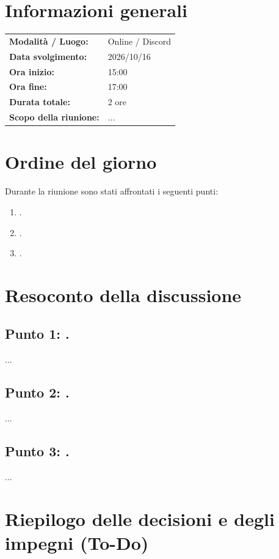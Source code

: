 \documentclass[a4paper, 11pt]{article}
\begin{document}
\newpage
\tableofcontents
\newpage


\section{Informazioni generali}
\begin{tabularx}{\textwidth}{l X}
    \textbf{Modalità / Luogo:} & Online / Discord \\
    \textbf{Data svolgimento:} & 2026/10/16 \\
    \textbf{Ora inizio:} & 15:00 \\
    \textbf{Ora fine:} & 17:00 \\
    \textbf{Durata totale:} & 2 ore \\
    \textbf{Scopo della riunione:} & ... \\
\end{tabularx}

\newpage


\section{Ordine del giorno}
Durante la riunione sono stati affrontati i seguenti punti:
\begin{enumerate}
    \item .
    \item .
    \item .
\end{enumerate}

\newpage


\section{Resoconto della discussione}

\subsection{Punto 1: .}
...
\subsection{Punto 2: .}
...
\subsection{Punto 3: .}
...
\newpage


\section{Riepilogo delle decisioni e degli impegni (To-Do)}
\end{document}
